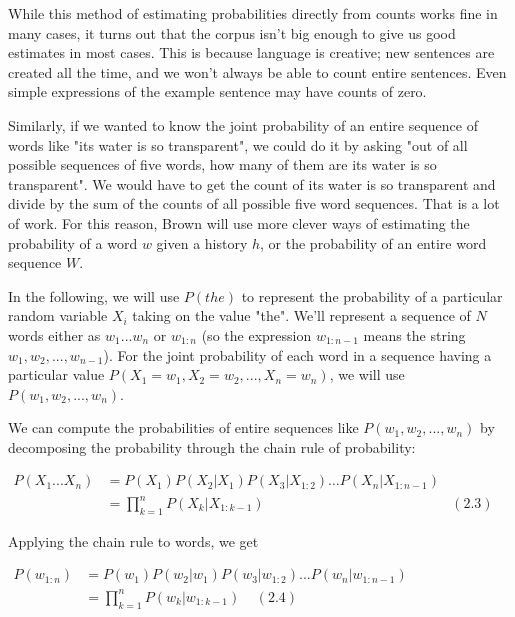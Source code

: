 While this method of estimating probabilities directly from counts works fine in many cases, it turns out that the corpus isn't big enough to give us good estimates in most cases. This is because language is creative; new sentences are created all the time, and we won't always be able to count entire sentences. Even simple expressions of the example sentence may have counts of zero.

Similarly, if we wanted to know the joint probability of an entire sequence of words like "its water is so transparent", we could do it by asking "out of all possible sequences of five words, how many of them are its water is so transparent". We would have to get the count of its water is so transparent and divide by the sum of the counts of all possible five word sequences. That is a lot of work. For this reason, Brown will use more clever ways of estimating the probability of a word $w$ given a history $h$, or the probability of an entire word sequence $W$.

In the following, we will use $P(the)$ to represent the probability of a particular random variable $X_i$ taking on the value "the". We'll represent a sequence of $N$ words either as $w_1...w_n$ or $w_{1:n}$ (so the expression $w_{1:n-1}$ means the string $w_1,w_2,...,w_{n-1}$). For the joint probability of each word in a sequence having a particular value $P(X_1=w_1,X_2=w_2,...,X_n=w_n)$, we will use $P(w_1,w_2,...,w_n)$.

We can compute the probabilities of entire sequences like $P(w_1,w_2,...,w_n)$ by decomposing the probability through the chain rule of probability:
\begin{center}
$	\begin{array}{llc}
		P(X_1...X_n) 	&= P(X_1)P(X_2|X_1)P(X_3|X_{1:2})\dots P(X_n|X_{1:n-1})	&	\\
							&= \prod_{k=1}^n P(X_k|X_{1:k-1})								& (2.3)
	\end{array}
$
\end{center}


Applying the chain rule to words, we get
\begin{center}
$	\begin{aligned}
		P(w_{1:n}) &= P(w_1)P(w_2|w_1)P(w_3|w_{1:2})...P(w_n|w_{1:n-1})\\
		&= \prod_{k=1}^n P(w_k|w_{1:k-1})\ \ \ \ \ (2.4)
	\end{aligned}
$
\end{center}




